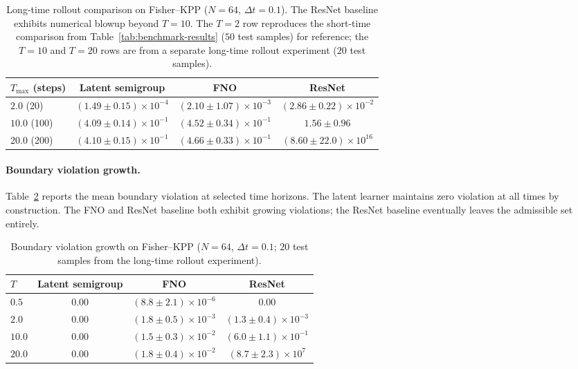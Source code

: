 \documentclass[hidelinks,review,nohypdvips,onefignum,onetabnum]{siamart220329}
\begin{document}
\begin{table}[htbp]
\centering
\caption{Long-time rollout comparison on Fisher--KPP ($N=64$, $\Delta t=0.1$). The ResNet baseline exhibits numerical blowup beyond $T=10$. The $T{=}2$ row reproduces the short-time comparison from Table~\ref{tab:benchmark-results} ($50$ test samples) for reference; the $T{=}10$ and $T{=}20$ rows are from a separate long-time rollout experiment ($20$ test samples).}
\label{tab:long-time}
\small
\begin{tabular}{@{}lccc@{}}
\hline
$T_{\max}$ (steps) & Latent semigroup & FNO & ResNet \\
\hline
$2.0$ (20) & $(1.49\pm 0.15)\times10^{-4}$ & $(2.10\pm 1.07)\times10^{-3}$ & $(2.86\pm 0.22)\times10^{-2}$ \\
$10.0$ (100) & $(4.09\pm 0.14)\times10^{-1}$ & $(4.52\pm 0.34)\times10^{-1}$ & $1.56\pm 0.96$ \\
$20.0$ (200) & $(4.10\pm 0.15)\times10^{-1}$ & $(4.66\pm 0.33)\times10^{-1}$ & $(8.60\pm 22.0)\times10^{16}$ \\
\hline
\end{tabular}
\end{table}

\paragraph{Boundary violation growth.}
Table~\ref{tab:boundary-growth} reports the mean boundary violation at selected time horizons. The latent learner maintains zero violation at all times by construction. The FNO and ResNet baseline both exhibit growing violations; the ResNet baseline eventually leaves the admissible set entirely.

\begin{table}[htbp]
\centering
\caption{Boundary violation growth on Fisher--KPP ($N=64$, $\Delta t=0.1$; $20$ test samples from the long-time rollout experiment).}
\label{tab:boundary-growth}
\small
\begin{tabular}{@{}lccc@{}}
\hline
$T$ & Latent semigroup & FNO & ResNet \\
\hline
$0.5$ & $0.00$ & $(8.8\pm 2.1)\times10^{-6}$ & $0.00$ \\
$2.0$ & $0.00$ & $(1.8\pm 0.5)\times10^{-3}$ & $(1.3\pm 0.4)\times10^{-3}$ \\
$10.0$ & $0.00$ & $(1.5\pm 0.3)\times10^{-2}$ & $(6.0\pm 1.1)\times10^{-1}$ \\
$20.0$ & $0.00$ & $(1.8\pm 0.4)\times10^{-2}$ & $(8.7\pm 2.3)\times10^{7}$ \\
\hline
\end{tabular}
\end{table}
\end{document}
